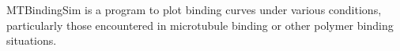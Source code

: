 
\noindent{}

MTBindingSim is a program to plot binding curves under various conditions,
particularly those encountered in microtubule binding or other polymer binding
situations.

